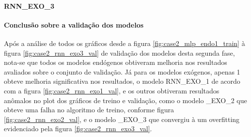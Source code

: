 \documentclass[	12pt, Times, openright, twoside, a4paper, english, brazil]{abntex2}
\begin{document}
            \paragraph{RNN\_EXO\_3}
            {\begin{center} \begin{minipage}[b]{0.45\textwidth}
    	    \begin{figure}[H]
            \end{figure}\end{minipage} \hfill %
             \begin{minipage}[b]{1.0\textwidth}
            \begin{figure}[H]
            \end{figure}\end{minipage} \end{center} }
            
            \paragraph{Conclusão sobre a validação dos modelos}
    	        Após a análise de todos os gráficos desde a figura \ref{fig:case2_mlp_endo1_train} à figura \ref{fig:case2_rnn_exo3_val} de validação dos modelos desta segunda fase, nota-se que todos os modelos endógenos obtiveram melhoria nos resultados avaliados sobre o conjunto de validação.
    	        Já para os modelos exógenos, apenas 1 obteve melhoria significativa nos resultados, o modelo RNN\_EXO\_1 de acordo com a figura \ref{fig:case2_rnn_exo1_val}, e os outros obtiveram resultados anômalos no plot dos gráficos de treino e validação, como o modelo \RNN\_EXO\_2 que obteve uma falha no algoritmo de treino, conforme figura \ref{fig:case2_rnn_exo2_val}, e o modelo \RNN\_EXO\_3 que convergiu à um overfitting evidenciado pela figura \ref{fig:case2_rnn_exo3_val}.
    	    
\end{document}
